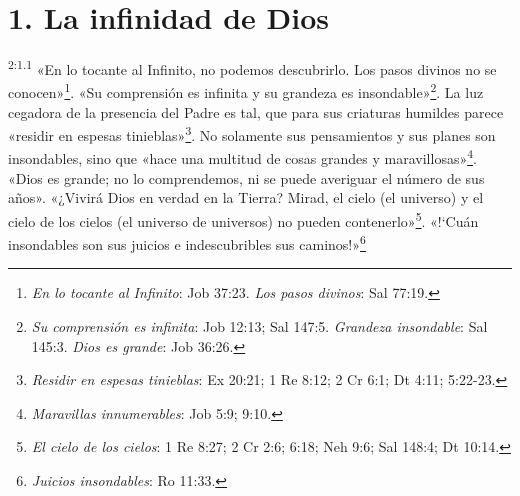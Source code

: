 \section*{1. La infinidad de Dios}
\par
\textsuperscript{2:1.1} «En lo tocante al Infinito, no podemos descubrirlo. Los pasos divinos no se conocen»\footnote{\textit{En lo tocante al Infinito}: Job 37:23. \textit{Los pasos divinos}: Sal 77:19.}. «Su comprensión es infinita y su grandeza es insondable»\footnote{\textit{Su comprensión es infinita}: Job 12:13; Sal 147:5. \textit{Grandeza insondable}: Sal 145:3. \textit{Dios es grande}: Job 36:26.}. La luz cegadora de la presencia del Padre es tal, que para sus criaturas humildes parece «residir en espesas tinieblas»\footnote{\textit{Residir en espesas tinieblas}: Ex 20:21; 1 Re 8:12; 2 Cr 6:1; Dt 4:11; 5:22-23.}. No solamente sus pensamientos y sus planes son insondables, sino que «hace una multitud de cosas grandes y maravillosas»\footnote{\textit{Maravillas innumerables}: Job 5:9; 9:10.}. «Dios es grande; no lo comprendemos, ni se puede averiguar el número de sus años». «¿Vivirá Dios en verdad en la Tierra? Mirad, el cielo (el universo) y el cielo de los cielos (el universo de universos) no pueden contenerlo»\footnote{\textit{El cielo de los cielos}: 1 Re 8:27; 2 Cr 2:6; 6:18; Neh 9:6; Sal 148:4; Dt 10:14.}. «!`Cuán insondables son sus juicios e indescubribles sus caminos!»\footnote{\textit{Juicios insondables}: Ro 11:33.}

